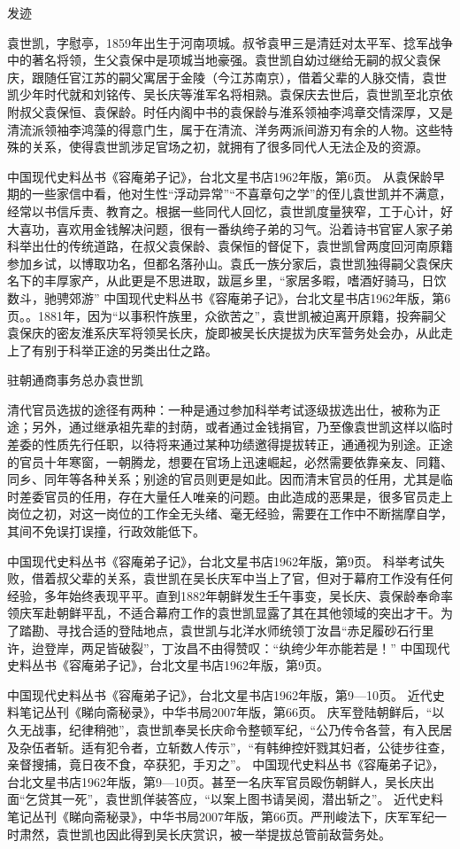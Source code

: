 \documentclass[12pt,UTF8]{ctexbook}
\begin{document}
发迹

袁世凯，字慰亭，1859年出生于河南项城。叔爷袁甲三是清廷对太平军、捻军战争中的著名将领，生父袁保中是项城当地豪强。袁世凯自幼过继给无嗣的叔父袁保庆，跟随任官江苏的嗣父寓居于金陵（今江苏南京），借着父辈的人脉交情，袁世凯少年时代就和刘铭传、吴长庆等淮军名将相熟。袁保庆去世后，袁世凯至北京依附叔父袁保恒、袁保龄。时任内阁中书的袁保龄与淮系领袖李鸿章交情深厚，又是清流派领袖李鸿藻的得意门生，属于在清流、洋务两派间游刃有余的人物。这些特殊的关系，使得袁世凯涉足官场之初，就拥有了很多同代人无法企及的资源。

中国现代史料丛书《容庵弟子记》，台北文星书店1962年版，第6页。
从袁保龄早期的一些家信中看，他对生性“浮动异常”“不喜章句之学”的侄儿袁世凯并不满意，经常以书信斥责、教育之。根据一些同代人回忆，袁世凯度量狭窄，工于心计，好大喜功，喜欢用金钱解决问题，很有一番纨绔子弟的习气。沿着诗书官宦人家子弟科举出仕的传统道路，在叔父袁保龄、袁保恒的督促下，袁世凯曾两度回河南原籍参加乡试，以博取功名，但都名落孙山。袁氏一族分家后，袁世凯独得嗣父袁保庆名下的丰厚家产，从此更是不思进取，跋扈乡里，“家居多暇，嗜酒好骑马，日饮数斗，驰骋郊游” 中国现代史料丛书《容庵弟子记》，台北文星书店1962年版，第6页。。1881年，因为“以事积忤族里，众欲苦之”，袁世凯被迫离开原籍，投奔嗣父袁保庆的密友淮系庆军将领吴长庆，旋即被吴长庆提拔为庆军营务处会办，从此走上了有别于科举正途的另类出仕之路。


驻朝通商事务总办袁世凯

清代官员选拔的途径有两种：一种是通过参加科举考试逐级拔选出仕，被称为正途；另外，通过继承祖先辈的封荫，或者通过金钱捐官，乃至像袁世凯这样以临时差委的性质先行任职，以待将来通过某种功绩邀得提拔转正，通通视为别途。正途的官员十年寒窗，一朝腾龙，想要在官场上迅速崛起，必然需要依靠亲友、同籍、同乡、同年等各种关系；别途的官员则更是如此。因而清末官员的任用，尤其是临时差委官员的任用，存在大量任人唯亲的问题。由此造成的恶果是，很多官员走上岗位之初，对这一岗位的工作全无头绪、毫无经验，需要在工作中不断揣摩自学，其间不免误打误撞，行政效能低下。

中国现代史料丛书《容庵弟子记》，台北文星书店1962年版，第9页。
科举考试失败，借着叔父辈的关系，袁世凯在吴长庆军中当上了官，但对于幕府工作没有任何经验，多年始终表现平平。直到1882年朝鲜发生壬午事变，吴长庆、袁保龄奉命率领庆军赴朝鲜平乱，不适合幕府工作的袁世凯显露了其在其他领域的突出才干。为了踏勘、寻找合适的登陆地点，袁世凯与北洋水师统领丁汝昌“赤足履砂石行里许，迨登岸，两足皆破裂”，丁汝昌不由得赞叹：“纨绔少年亦能若是！” 中国现代史料丛书《容庵弟子记》，台北文星书店1962年版，第9页。

中国现代史料丛书《容庵弟子记》，台北文星书店1962年版，第9—10页。
近代史料笔记丛刊《睇向斋秘录》，中华书局2007年版，第66页。
庆军登陆朝鲜后，“以久无战事，纪律稍弛”，袁世凯奉吴长庆命令整顿军纪，“公乃传令各营，有入民居及杂伍者斩。适有犯令者，立斩数人传示”，“有韩绅控奸戮其妇者，公徒步往查，亲督搜捕，竟日夜不食，卒获犯，手刃之”。 中国现代史料丛书《容庵弟子记》，台北文星书店1962年版，第9—10页。甚至一名庆军官员殴伤朝鲜人，吴长庆出面“乞贷其一死”，袁世凯佯装答应，“以案上图书请吴阅，潜出斩之”。 近代史料笔记丛刊《睇向斋秘录》，中华书局2007年版，第66页。严刑峻法下，庆军军纪一时肃然，袁世凯也因此得到吴长庆赏识，被一举提拔总管前敌营务处。
\end{document}
